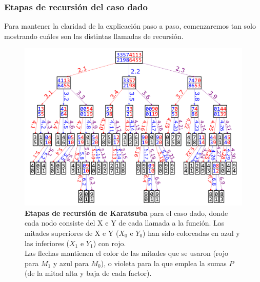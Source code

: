 \documentclass[titlepage,a4paper]{article}
\begin{document}
\subsubsection{Etapas de recursión del caso dado}
Para mantener la claridad de la explicación paso a paso, comenzaremos tan solo mostrando cuáles son las distintas llamadas de recursión.

\begin{figure}[H]
\centering
\includegraphics[width=\textwidth,angle=90,origin=c]{KaratsubaArbol.png}
\caption{\label{fig:etapas}\textbf{Etapas de recursión de Karatsuba} para el caso dado,
donde cada nodo consiste del X e Y de cada llamada a la función. 
Las mitades superiores
 de X e Y ($X_0$ e $Y_0$) han sido coloreadas en azul y las inferiores ($X_1$ e $Y_1$) con rojo.\\
Las flechas mantienen el color de las mitades que se usaron (rojo para $M_1$ y azul para $M_0$),
o violeta para la que emplea la sumas $P$ (de la mitad alta y baja de cada factor).}
 \end{figure}
\end{document}
